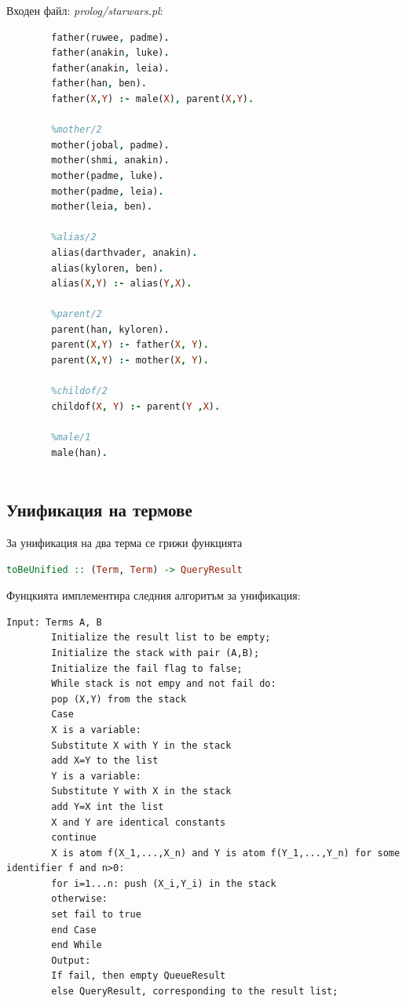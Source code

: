 \documentclass[15pt]{extarticle}
\begin{document}
	Входен файл: \emph{prolog/starwars.pl}:
	
	\begin{lstlisting}[language=Prolog,numbers=right]
		%father/2
		father(ruwee, padme).
		father(anakin, luke).
		father(anakin, leia).
		father(han, ben).
		father(X,Y) :- male(X), parent(X,Y).
		
		%mother/2
		mother(jobal, padme).
		mother(shmi, anakin).
		mother(padme, luke).
		mother(padme, leia).
		mother(leia, ben).
		
		%alias/2
		alias(darthvader, anakin).
		alias(kyloren, ben).
		alias(X,Y) :- alias(Y,X).
		
		%parent/2
		parent(han, kyloren).
		parent(X,Y) :- father(X, Y).
		parent(X,Y) :- mother(X, Y).
		
		%childof/2
		childof(X, Y) :- parent(Y ,X).
		
		%male/1
		male(han).
		
	\end{lstlisting}
	
	\subsection{Унификация на термове}
	
	За унификация на два терма се грижи функцията
	
	\begin{lstlisting}[language=haskell]
		toBeUnified :: (Term, Term) -> QueryResult
	\end{lstlisting}
	
	Фунцкията имплементира следния алгоритъм за унификация:
	
	\begin{lstlisting}[numbers=right]
		Input: Terms A, B
		Initialize the result list to be empty;
		Initialize the stack with pair (A,B);
		Initialize the fail flag to false;
		While stack is not empy and not fail do:
		pop (X,Y) from the stack
		Case
		X is a variable:
		Substitute X with Y in the stack
		add X=Y to the list
		Y is a variable:
		Substitute Y with X in the stack
		add Y=X int the list
		X and Y are identical constants 
		continue
		X is atom f(X_1,...,X_n) and Y is atom f(Y_1,...,Y_n) for some identifier f and n>0:
		for i=1...n: push (X_i,Y_i) in the stack
		otherwise:
		set fail to true
		end Case
		end While
		Output:
		If fail, then empty QueueResult
		else QueryResult, corresponding to the result list;
		
	\end{lstlisting}
\end{document}
